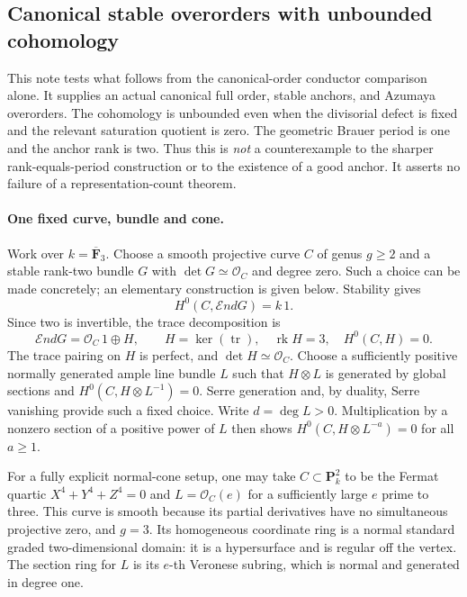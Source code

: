 \subsection*{Canonical stable overorders with unbounded cohomology}

This note tests what follows from the canonical-order conductor
comparison alone. It supplies an actual canonical full order, stable
anchors, and Azumaya overorders. The cohomology is unbounded even
when the divisorial defect is fixed and the relevant saturation
quotient is zero. The geometric Brauer period is one and the anchor
rank is two. Thus this is \emph{not} a counterexample to the sharper
rank-equals-period construction or to the existence of a good anchor.
It asserts no failure of a representation-count theorem.

\paragraph{One fixed curve, bundle and cone.}
Work over $k=\overline{\mathbf F}_3$. Choose a smooth projective
curve $C$ of genus $g\ge2$ and a stable rank-two bundle $G$ with
$\det G\simeq\mathcal O_C$ and degree zero. Such a choice can be
made concretely; an elementary construction is given below.
Stability gives
\[
 H^0(C,\mathcal End G)=k\,1.
\]
Since two is invertible, the trace decomposition is
\[
 \mathcal End G=\mathcal O_C\,1\oplus H,
 \qquad H=\ker(\operatorname{tr}),\quad \operatorname{rk}H=3,
 \quad H^0(C,H)=0.
\]
The trace pairing on $H$ is perfect, and $\det H\simeq\mathcal O_C$.
Choose a sufficiently positive normally generated ample line bundle
$L$ such that $H\otimes L$ is generated by global sections and
$H^0(C,H\otimes L^{-1})=0$. Serre generation and, by duality,
Serre vanishing provide such a fixed choice. Write $d=\deg L>0$.
Multiplication by a nonzero section of a positive power of $L$
then shows $H^0(C,H\otimes L^{-a})=0$ for all $a\ge1$.

For a fully explicit normal-cone setup, one may take
$C\subset\mathbf P^2_k$ to be the Fermat quartic
$X^4+Y^4+Z^4=0$ and $L=\mathcal O_C(e)$ for a sufficiently large
$e$ prime to three. This curve is smooth because its partial
derivatives have no simultaneous projective zero, and $g=3$.
Its homogeneous coordinate ring is a normal standard graded
two-dimensional domain: it is a hypersurface and is regular
off the vertex. The section ring for $L$ is its $e$-th Veronese
subring, which is normal and generated in degree one.

